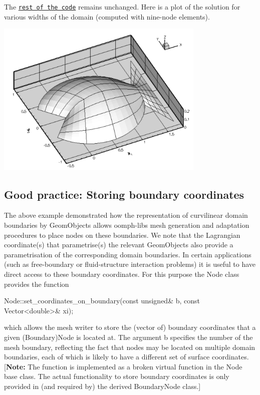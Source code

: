 The \href{../../../../demo_drivers/poisson/fish_poisson2/fish_poisson_node_update.cc}{\tt rest of the code} remains unchanged. Here is a plot of the solution for various widths of the domain (computed with nine-\/node elements).

 
\begin{DoxyImage}
\includegraphics[width=0.75\textwidth]{fish_poisson_node_update}
\end{DoxyImage}




 

\hypertarget{index_boundary_coords}{}\subsection{Good practice\+: Storing boundary coordinates}\label{index_boundary_coords}
The above example demonstrated how the representation of curvilinear domain boundaries by {\ttfamily Geom\+Objects} allows {\ttfamily oomph-\/lib\textquotesingle{}s} mesh generation and adaptation procedures to place nodes on these boundaries. We note that the Lagrangian coordinate(s) that parametrise(s) the relevant {\ttfamily Geom\+Objects} also provide a parametrisation of the corresponding domain boundaries. In certain applications (such as free-\/boundary or fluid-\/structure interaction problems) it is useful to have direct access to these boundary coordinates. For this purpose the {\ttfamily Node} class provides the function 
\begin{DoxyCode}
Node::set\_coordinates\_on\_boundary(\textcolor{keyword}{const} \textcolor{keywordtype}{unsigned}& b, 
                                  \textcolor{keyword}{const} Vector<double>& xi);
\end{DoxyCode}
 which allows the mesh writer to store the (vector of) boundary coordinates that a given ({\ttfamily Boundary}){\ttfamily Node} is located at. The argument {\ttfamily b} specifies the number of the mesh boundary, reflecting the fact that nodes may be located on multiple domain boundaries, each of which is likely to have a different set of surface coordinates. \mbox{[}{\bfseries Note\+:} The function is implemented as a broken virtual function in the {\ttfamily Node} base class. The actual functionality to store boundary coordinates is only provided in (and required by) the derived {\ttfamily Boundary\+Node} class.\mbox{]}

